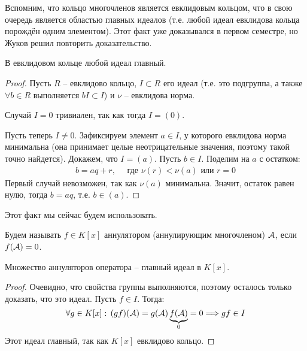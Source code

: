 Вспомним, что кольцо многочленов является евклидовым кольцом, что в свою очередь является областью главных идеалов (т.е. любой идеал евклидова кольца порождён одним элементом). 
Этот факт уже доказывался в первом семестре, но Жуков решил повторить доказательство. 

\begin{lemma}
    В евклидовом кольце любой идеал главный.

    \begin{proof}
    Пусть $R$ -- евклидово кольцо, $I \subset R$ его идеал (т.е. это подгруппа, а также $\forall b \in R$ выполняется $bI \subset I$) и $\nu$ -- евклидова норма.
    
    \quad Случай $I = 0$ тривиален, так как тогда $I = (0)$.

    \quad Пусть теперь $I \neq 0$. 
    Зафиксируем элемент $a \in I$, у которого евклидова норма минимальна (она принимает целые неотрицательные значения, поэтому такой точно найдется).
    Докажем, что $I = (a)$. Пусть $ b \in I$. Поделим на $a$ с остатком:
    \begin{gather*}
        b = aq + r, \quad \text{ где } \nu(r) < \nu(a) \text{ или } r = 0
    \end{gather*}
    \quad Первый случай невозможен, так как $ \nu(a) $ минимальна. 
    Значит, остаток равен нулю, тогда $b = aq$, т.е. $b \in (a)$.
    \end{proof}
\end{lemma}

\vspace*{3mm}

Этот факт мы сейчас будем использовать.

\vspace*{3mm}

\begin{conj} 
    Будем называть $f \in K[x]$ аннулятором (аннулирующим многочленом) $\mathcal{A}$, если $f(\mathcal{A}) = 0$.
\end{conj}

\vspace*{3mm}

\begin{theorem}
    Множество аннуляторов оператора -- главный идеал в $K[x]$.
\end{theorem}
\begin{proof}
    Очевидно, что свойства группы выполняются, поэтому осталось только доказать, что это идеал.
    Пусть $ f \in I$. Тогда:
    \[ \forall g \in K[x]: \, (gf)(\mathcal{A}) = g(\mathcal{A}) \underbrace{f(\mathcal{A})}_{0} = 0 \Longrightarrow gf \in I \]
    \quad Этот идеал главный, так как $K[x]$ евклидово кольцо.
\end{proof}

